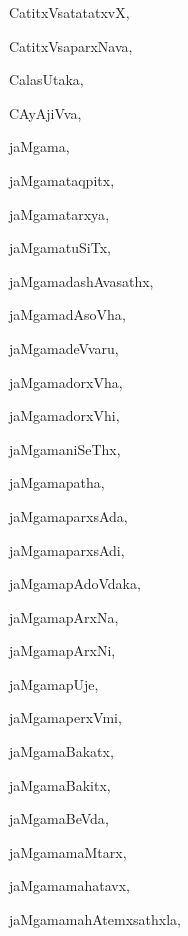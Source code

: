\begin{multicols}{3}
{\noindent
{CatitxVsatatatxvX}, \pageref{CatitxVsatatatxvX}

\noindent
{CatitxVsaparxNava}, \pageref{CatitxVsaparxNava}

\noindent
{CalasUtaka}, \pageref{CalasUtaka}

\noindent
{CAyAjiVva}, \pageref{CAyAjiVva}

\bigskip
\noindent
{}
\smallskip

\noindent
{jaMgama}, \pageref{jaMgama}

\noindent
{jaMgamataqpitx}, \pageref{jaMgamataqpitx}

\noindent
{jaMgamatarxya}, \pageref{jaMgamatarxya}

\noindent
{jaMgamatuSiTx}, \pageref{jaMgamatuSiTx}

\noindent
{jaMgamadashAvasathx}, \pageref{jaMgamadashAvasathx}

\noindent
{jaMgamadAsoVha}, \pageref{jaMgamadAsoVha}

\noindent
{jaMgamadeVvaru}, \pageref{jaMgamadeVvaru}

\noindent
{jaMgamadorxVha}, \pageref{jaMgamadorxVha}

\noindent
{jaMgamadorxVhi}, \pageref{jaMgamadorxVhi}

\noindent
{jaMgamaniSeThx}, \pageref{jaMgamaniSeThx}

\noindent
{jaMgamapatha}, \pageref{jaMgamapatha}

\noindent
{jaMgamaparxsAda}, \pageref{jaMgamaparxsAda}

\noindent
{jaMgamaparxsAdi}, \pageref{jaMgamaparxsAdi}

\noindent
{jaMgamapAdoVdaka}, \pageref{jaMgamapAdoVdaka}

\noindent
{jaMgamapArxNa}, \pageref{jaMgamapArxNa}

\noindent
{jaMgamapArxNi}, \pageref{jaMgamapArxNi}

\noindent
{jaMgamapUje}, \pageref{jaMgamapUje}

\noindent
{jaMgamaperxVmi}, \pageref{jaMgamaperxVmi}

\noindent
{jaMgamaBakatx}, \pageref{jaMgamaBakatx}

\noindent
{jaMgamaBakitx}, \pageref{jaMgamaBakitx}

\noindent
{jaMgamaBeVda}, \pageref{jaMgamaBeVda}

\noindent
{jaMgamamaMtarx}, \pageref{jaMgamamaMtarx}

\noindent
{jaMgamamahatavx}, \pageref{jaMgamamahatavx}

\noindent
{jaMgamamahAtemxsathxla}, \pageref{jaMgamamahAtemxsathxla}

}
\end{multicols}
